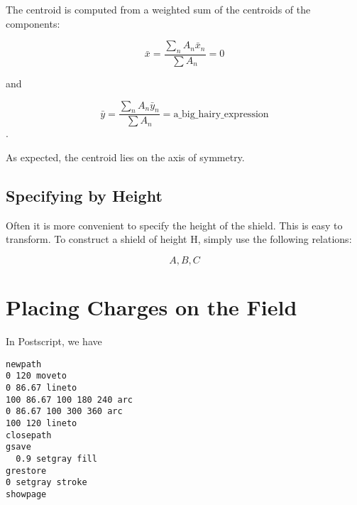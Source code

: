 \documentclass{article}
\begin{document}
The centroid is computed from a weighted sum of the centroids of the components:

$$ \bar{x} = \frac{\sum_n A_n\bar{x}_n}{\sum A_n} = 0 $$

and

$$ \bar{y} = \frac{\sum_n A_n\bar{y}_n}{\sum A_n} = \mathrm{a\_big\_hairy\_expression}$$.

As expected, the centroid lies on the axis of symmetry.

\subsection{Specifying by Height}

Often it is more convenient to specify the height of the shield.  This is
easy to transform.  To construct a shield of height H, simply use the following
relations:

$$A, B, C$$

\section{Placing Charges on the Field}

In Postscript, we have
\begin{verbatim}
newpath
0 120 moveto
0 86.67 lineto
100 86.67 100 180 240 arc
0 86.67 100 300 360 arc
100 120 lineto
closepath
gsave
  0.9 setgray fill
grestore
0 setgray stroke
showpage
\end{verbatim}
\end{document}
